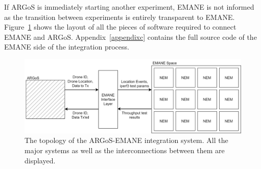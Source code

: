 If ARGoS is immediately starting another experiment, EMANE is not informed as the transition between experiments is entirely transparent to EMANE.
Figure~\ref{emane_argos} shows the layout of all the pieces of software required to connect EMANE and ARGoS.
Appendix~\ref{appendixc} contains the full source code of the EMANE side of the integration process.
\begin{figure}[!ht]
    \centering
    \includegraphics[width=\textwidth,keepaspectratio]{Images/Chpt5/ARGoS-EMANE.png}
    \caption{The topology of the ARGoS-EMANE integration system. All the major systems as well as the interconnections between them are displayed.}
    \label{emane_argos}
\end{figure}

